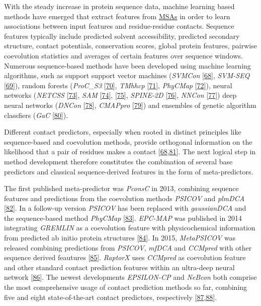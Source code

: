 \documentclass[11pt,a4paper,twoside]{book}
\theoremstyle{definition}
\theoremstyle{definition}
\theoremstyle{remark}
\begin{document}
With the steady increase in protein sequence data, machine learning
based methods have emerged that extract features from
\protect\hyperlink{abbrev}{MSAs} in order to learn associations between
input features and residue-residue contacts. Sequence features typically
include predicted solvent accessibility, predicted secondary structure,
contact potentials, conservation scores, global protein features,
pairwise coevolution statistics and averages of certain features over
sequence windows. Numerous sequence-based methods have been developed
using machine learning algorithms, such as support support vector
machines (\emph{SVMCon} {[}\protect\hyperlink{ref-Cheng2007}{68}{]},
\emph{SVM-SEQ} {[}\protect\hyperlink{ref-Wu2008}{69}{]}), random forests
(\emph{ProC\_S3} {[}\protect\hyperlink{ref-Li2011}{70}{]}, \emph{TMhhcp}
{[}\protect\hyperlink{ref-Wang2011}{71}{]}, \emph{PhyCMap}
{[}\protect\hyperlink{ref-Wang2013}{72}{]}), neural networks
(\emph{NETCSS} {[}\protect\hyperlink{ref-Fariselli2001a}{73}{]},
\emph{SAM} {[}\protect\hyperlink{ref-Shackelford2007}{74}{]},
{[}\protect\hyperlink{ref-Hamilton2004a}{75}{]}, \emph{SPINE-2D}
{[}\protect\hyperlink{ref-Xue2009a}{76}{]}, \emph{NNCon}
{[}\protect\hyperlink{ref-Tegge2009a}{77}{]}) deep neural networks
(\emph{DNCon} {[}\protect\hyperlink{ref-Eickholt2012}{78}{]},
\emph{CMAPpro} {[}\protect\hyperlink{ref-DiLena2012a}{79}{]}) and
ensembles of genetic algorithm classfiers (\emph{GaC}
{[}\protect\hyperlink{ref-Chen2010}{80}{]}).

Different contact predictors, especially when rooted in distinct
principles like sequence-based and coevolution methods, provide
orthogonal information on the likelihood that a pair of residues makes a
contact
{[}\protect\hyperlink{ref-Cheng2007}{68},\protect\hyperlink{ref-Jones2015}{81}{]}.
The next logical step in method development therefore constitutes the
combination of several base predictors and classical sequence-derived
features in the form of meta-predictors.

The first published meta-predictor was \emph{PconsC} in 2013, combining
sequence features and predictions from the coevolution methods
\emph{PSICOV} and \emph{plmDCA}
{[}\protect\hyperlink{ref-Skwark2013}{82}{]}. In a follow-up version
\emph{PSICOV} has been replaced with \emph{gaussianDCA} and the
sequence-based method \emph{PhyCMap}
{[}\protect\hyperlink{ref-Skwark2016}{83}{]}. \emph{EPC-MAP} was
published in 2014 integrating \emph{GREMLIN} as a coevolution feature
with physicochemical information from predicted ab initio protein
structures {[}\protect\hyperlink{ref-Schneider2014}{84}{]}. In 2015,
\emph{MetaPSICOV} was released combining predictions from \emph{PSICOV},
\emph{mfDCA} and \emph{CCMpred} with other sequence derived feautures
{[}\protect\hyperlink{ref-Jones2015a}{85}{]}. \emph{RaptorX} uses
\emph{CCMpred} as coevolution feature and other standard contact
prediction features within an ultra-deep neural network
{[}\protect\hyperlink{ref-Wang2016a}{86}{]}. The newest developments
\emph{EPSILON-CP} and \emph{NeBcon} both comprise the most comprehensive
usage of contact prediction methods so far, combining five and eight
state-of-the-art contact predictors, respectively
{[}\protect\hyperlink{ref-Stahl2017}{87},\protect\hyperlink{ref-He2017}{88}{]}.
\end{document}
